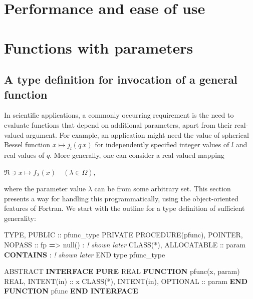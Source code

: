 \documentclass[
]{article}
\newenvironment{Shaded}{}{}
\newcommand{\CommentTok}[1]{\textcolor[rgb]{0.38,0.63,0.69}{\textit{#1}}}
\newcommand{\DataTypeTok}[1]{\textcolor[rgb]{0.56,0.13,0.00}{#1}}
\newcommand{\KeywordTok}[1]{\textcolor[rgb]{0.00,0.44,0.13}{\textbf{#1}}}
\newcommand{\NormalTok}[1]{#1}
\newcommand{\OperatorTok}[1]{\textcolor[rgb]{0.40,0.40,0.40}{#1}}
\begin{document}
\section{Performance and ease of use}\label{performance-and-ease-of-use}

\section{Functions with parameters}\label{sec:functions_with_parameters}

\subsection{A type definition for invocation of a general
function}\label{a-type-definition-for-invocation-of-a-general-function}

In scientific applications, a commonly occurring requirement is the need
to evaluate functions that depend on additional parameters, apart from
their real-valued argument. For example, an application might need the
value of spherical Bessel function \(x \mapsto j_l(q \, x)\) for
independently specified integer values of \(l\) and real values of
\(q\). More generally, one can consider a real-valued mapping

\(\Re \ni x \mapsto f_\lambda(x) \quad (\lambda \in \Omega)\),

where the parameter value \(\lambda\) can be from some arbitrary set.
This section presents a way for handling this programmatically, using
the object-oriented features of Fortran. We start with the outline for a
type definition of sufficient generality:

\begin{Shaded}
\begin{Highlighting}[]
\DataTypeTok{TYPE}\NormalTok{, }\DataTypeTok{PUBLIC} \DataTypeTok{::}\NormalTok{ pfunc\_type}
   \DataTypeTok{PRIVATE}
   \DataTypeTok{PROCEDURE(pfunc)}\NormalTok{, }\DataTypeTok{POINTER}\NormalTok{, }\DataTypeTok{NOPASS} \DataTypeTok{::}\NormalTok{ fp }\KeywordTok{=}\OperatorTok{\textgreater{}}\NormalTok{ null()}
\NormalTok{   : }\CommentTok{! shown later}
   \DataTypeTok{CLASS(*)}\NormalTok{, }\DataTypeTok{ALLOCATABLE} \DataTypeTok{::}\NormalTok{ param}
\KeywordTok{CONTAINS}
\NormalTok{   : }\CommentTok{! shown later}
\DataTypeTok{END type}\NormalTok{ pfunc\_type}

\DataTypeTok{ABSTRACT} \KeywordTok{INTERFACE}
   \KeywordTok{PURE} \DataTypeTok{REAL} \KeywordTok{FUNCTION}\NormalTok{ pfunc(x, param)}
      \DataTypeTok{REAL}\NormalTok{, }\DataTypeTok{INTENT(in)} \DataTypeTok{::}\NormalTok{ x}
      \DataTypeTok{CLASS(*)}\NormalTok{, }\DataTypeTok{INTENT(in)}\NormalTok{, }\DataTypeTok{OPTIONAL} \DataTypeTok{::}\NormalTok{ param}
   \KeywordTok{END FUNCTION}\NormalTok{ pfunc}
\KeywordTok{END INTERFACE}
\end{Highlighting}
\end{Shaded}
\end{document}
